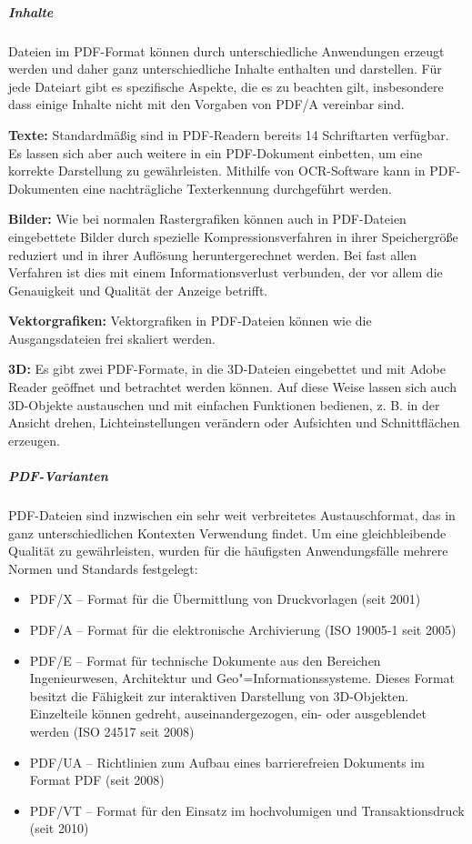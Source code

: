 \subparagraph{Inhalte}
Dateien im PDF-Format können durch unterschiedliche Anwendungen erzeugt werden und daher ganz unterschiedliche Inhalte enthalten und darstellen. Für jede Dateiart gibt es spezifische Aspekte, die es zu beachten gilt, insbesondere dass einige Inhalte nicht mit den Vorgaben von PDF/A vereinbar sind.

{\bfseries Texte:} Standardmäßig sind in PDF-Readern bereits 14 Schriftarten verfügbar. Es lassen sich aber auch weitere in ein PDF-Dokument einbetten, um eine korrekte Darstellung zu gewährleisten. Mithilfe von OCR-Software kann in PDF-Dokumenten eine nachträgliche Texterkennung durchgeführt werden.

{\bfseries Bilder:} Wie bei normalen Rastergrafiken können auch in PDF-Dateien eingebettete Bilder durch spezielle Kompressionsverfahren in ihrer Speichergröße reduziert und in ihrer Auflösung heruntergerechnet werden. Bei fast allen Verfahren ist dies mit einem Informationsverlust verbunden, der vor allem die Genauigkeit und Qualität der Anzeige betrifft.

{\bfseries Vektorgrafiken:} Vektorgrafiken in PDF-Dateien können wie die Ausgangsdateien frei skaliert werden.

{\bfseries 3D:} Es gibt zwei PDF-Formate, in die 3D-Dateien eingebettet und mit Adobe Reader geöffnet und betrachtet werden können. Auf diese Weise lassen sich auch 3D-Objekte austauschen und mit einfachen Funktionen bedienen, z. B. in der Ansicht drehen, Lichteinstellungen verändern oder Aufsichten und Schnittflächen erzeugen.

\subparagraph{PDF-Varianten}
PDF-Dateien sind inzwischen ein sehr weit verbreitetes Austauschformat, das in ganz unterschiedlichen Kontexten Verwendung findet. Um eine gleichbleibende Qualität zu gewährleisten, wurden für die häufigsten Anwendungsfälle mehrere Normen und Standards festgelegt:
\begin{itemize}
	\item PDF/X -- Format für die Übermittlung von Druckvorlagen (seit 2001)
	\item PDF/A -- Format für die elektronische Archivierung  (ISO 19005-1 seit 2005)
	\item PDF/E  -- Format für technische Dokumente aus den Bereichen Ingenieurwesen, Architektur und Geo"=Informationssysteme. Dieses Format besitzt die Fähigkeit zur interaktiven Darstellung von 3D-Objekten. Einzelteile können gedreht, auseinandergezogen, ein- oder ausgeblendet werden (ISO 24517 seit 2008)
	\item PDF/UA -- Richtlinien zum Aufbau eines barrierefreien Dokuments im Format PDF (seit 2008)
	\item PDF/VT  -- Format für den Einsatz im hochvolumigen und Transaktionsdruck (seit 2010)
\end{itemize}

